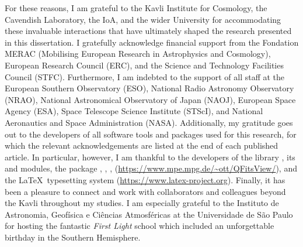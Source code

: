 \begin{acknowledgements}
    For these reasons, I am grateful to the Kavli Institute for Cosmology, the Cavendish Laboratory, the IoA, and the wider University for accommodating these invaluable interactions that have ultimately shaped the research presented in this dissertation. I gratefully acknowledge financial support from the Fondation MERAC (Mobilising European Research in Astrophysics and Cosmology), European Research Council (ERC), and the Science and Technology Facilities Council (STFC). Furthermore, I am indebted to the support of all staff at the European Southern Observatory (ESO), National Radio Astronomy Observatory (NRAO), National Astronomical Observatory of Japan (NAOJ), European Space Agency (ESA), Space Telescope Science Institute (STScI), and National Aeronautics and Space Administration (NASA). Additionally, my gratitude goes out to the developers of all software tools and packages used for this research, for which the relevant acknowledgements are listed at the end of each published article. In particular, however, I am thankful to the developers of the  library \citep{Jones2001}, its  \citep{2011CSE....13b..22V} and  \citep{Hunter2007} modules, the  package \citep{2013A&A...558A..33A, 2018AJ....156..123A},  \citep{2003ASPC..295..489J},  \citep[Tool for OPerations on Catalogues And Tables;][]{2005ASPC..347...29T},  (\url{https://www.mpe.mpg.de/~ott/QFitsView/}), and the \LaTeX\ typesetting system (\url{https://www.latex-project.org}). Finally, it has been a pleasure to connect and work with collaborators and colleagues beyond the Kavli throughout my studies. I am especially grateful to the Instituto de Astronomia, Geof{\'i}sica e Ci{\^e}ncias Atmosf{\'e}ricas at the Universidade de S{\~a}o Paulo for hosting the fantastic \textit{First Light} school which included an unforgettable birthday in the Southern Hemisphere.
    

\end{acknowledgements}
